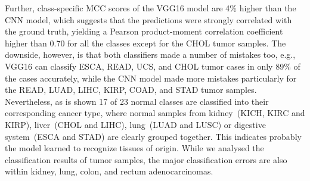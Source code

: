 \hspace*{3.5mm} Further, class-specific MCC scores of the VGG16 model are 4\% higher than the CNN model, which suggests that the predictions were strongly correlated with the ground truth, yielding a Pearson product-moment correlation coefficient higher than 0.70 for all the classes except for the CHOL tumor samples. The downside, however, is that both classifiers made a number of mistakes too, e.g., VGG16 can classify ESCA, READ, UCS, and CHOL tumor cases in only 89\% of the cases accurately, while the CNN model made more mistakes particularly for the READ, LUAD, LIHC, KIRP, COAD, and STAD tumor samples. Nevertheless, as is shown 17 of 23 normal classes are classified into their corresponding cancer type, where normal samples from kidney~(KICH, KIRC and KIRP), liver~(CHOL and LIHC), lung~(LUAD and LUSC) or digestive system~(ESCA and STAD) are clearly grouped together. This indicates probably the model learned to recognize tissues of origin. While we analysed the classification results of tumor samples, the major classification errors are also within kidney, lung, colon, and rectum adenocarcinomas.

